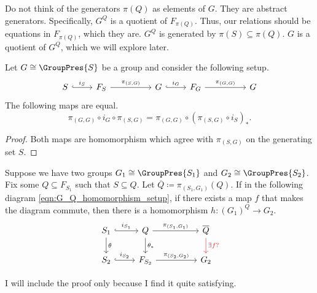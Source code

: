 Do not think of  the generators $\pi(Q)$ as elements of $G$.
They are abstract generators.
Specifically,  $G^Q$ is a quotient of  $F_{\pi(Q)}$.
Thus, our relations should be equations in $F_{\pi(Q)}$, which they are.
$G^Q$ is generated by $\pi(S) \subseteq \pi(Q)$.
$G$ is a quotient of  $G^Q$, which we will explore later.

\begin{lemma}
	Let $G \cong \GroupPres{S}$ be a group and consider the following setup.
	\[
		\begin{tikzcd}
			S \ar[r, hook, "i_S"] & F_S \ar[rr, "\pi_{(S,G)}"] & & G \ar[r, hook, "i_G"] & F_G \ar[rr, "\pi_{(G,G)}"] & & G
		\end{tikzcd}
	\]
	The following maps are equal.
	\[
		\pi_{(G,G)} \circ i_G \circ \pi_{(S,G)} = \pi_{(G,G)} \circ (\pi_{(S,G)} \circ i_S)_*
		.\]
	\label{lem:group_projections}
\end{lemma}

\begin{proof}
	Both maps are homomorphism which agree with $\pi_{\left( S,G\right)}$ on the generating set $S$.
\end{proof}

\begin{proposition}
	Suppose we have two groups $G_1 \cong \GroupPres{S_1}$ and $G_2 \cong \GroupPres{S_2}$.
	Fix some $Q \subseteq F_{S_1}$ such that  $S \subseteq Q$.
	Let $\overline{Q} \coloneqq \pi_{(S_1, G_1)}(Q) $.
	If in the following diagram \eqref{eqn:G_Q_homomorphism_setup}, if there exists a map $f$ that makes the diagram commute, then there is a homomorphism $h \colon (G_1)^Q \to G_2$.
	\begin{equation}
		\begin{tikzcd}
			S_1 \ar[d, "\theta"] \ar[r, hook, "i_{S_1}"] & Q \ar[d, "\theta_*"] \ar[rr, "\pi_{(S_1,G_1)}"] & & \overline{Q} \ar[d, color=red, "\exists f ?"] \\
			S_2 \ar[r, hook, "i_{S_2}"] & F_{S_2} \ar[rr, "\pi_{(S_2,G_2)}"] & & G_2
		\end{tikzcd}
		\label{eqn:G_Q_homomorphism_setup}
	\end{equation}
	\label{thm:G_Q_homomorphism}
\end{proposition}

I will include the proof only because I find it quite satisfying.

